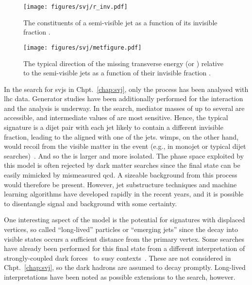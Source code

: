 \begin{figure}[htbp]
    \centering
    \texttt{[image: figures/svj/r\_inv.pdf]}
    \caption[The constituents of a semi-visible jet as a function of its invisible fraction]{The constituents of a semi-visible jet as a function of its invisible fraction \rinv \cite{Cohen:2017pzm}.}
    \label{fig:theory_svj_rinv}
\end{figure}
    
\begin{figure}[htbp]
    \centering
    \texttt{[image: figures/svj/metfigure.pdf]}
    \caption[The typical direction of the missing transverse energy relative to the semi-visible jets as a function of the invisible fraction \rinv]{The typical direction of the missing transverse energy \ETslash\xspace (or \ptmiss) relative to the semi-visible jets as a function of their invisible fraction \rinv \cite{Cohen:2017pzm}.}
    \label{fig:theory_svj_met_dir}
\end{figure}

In the search for \glspl{svj} in Chpt.~\ref{chap:svj}, only the \schannel process has been analysed with \acrshort{lhc} data. Generator studies have been additionally performed for the \tchannel interaction and the analysis is underway. In the \schannel search, mediator masses of up to several \TeV are accessible, and intermediate values of \rinv are most sensitive. Hence, the typical signature is a dijet pair with each jet likely to contain a different invisible fraction, leading to the \ptmiss aligned with one of the jets. \glspl{wimp}, on the other hand, would recoil from the visible matter in the event (e.g., in monojet or typical dijet searches)~\cite{Bertone:2017adx}. And so the \ptmiss is larger and more isolated. The phase space exploited by this model is often rejected by dark matter searches since the final state can be easily mimicked by mismeasured \acrshort{qcd}. A sizeable background from this process would therefore be present. However, jet substructure techniques and machine learning algorithms have developed rapidly in the recent years, and it is possible to disentangle signal and background with some certainty.

One interesting aspect of the model is the potential for signatures with displaced vertices, so called ``long-lived'' particles or ``emerging jets'' since the decay into visible states occurs a sufficient distance from the primary vertex. Some searches have already been performed for this final state from a different interpretation of strongly-coupled dark forces~\cite{Sirunyan:2018njd} to \acrlong{susy} contexts~\cite{SUS16038published}. These are not considered in Chpt.~\ref{chap:svj}, so the dark hadrons are assumed to decay promptly. Long-lived interpretations have been noted as possible extensions to the search, however.

